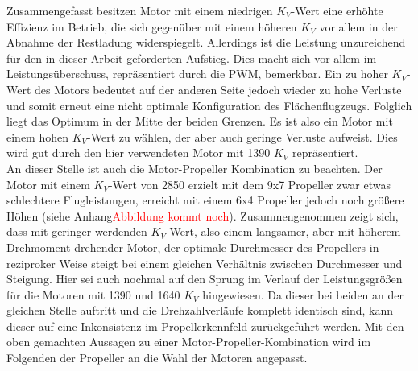 Zusammengefasst besitzen Motor mit einem niedrigen \ensuremath{K_V}-Wert eine erhöhte Effizienz im Betrieb, die sich gegenüber mit einem höheren \ensuremath{K_V} vor allem in der Abnahme der Restladung widerspiegelt. Allerdings ist die Leistung unzureichend für den in dieser Arbeit geforderten Aufstieg. Dies macht sich vor allem im Leistungsüberschuss, repräsentiert durch die PWM, bemerkbar. Ein zu hoher \ensuremath{K_V}-Wert des Motors bedeutet auf der anderen Seite jedoch wieder zu hohe Verluste und somit erneut eine nicht optimale Konfiguration des Flächenflugzeugs. Folglich liegt das Optimum in der Mitte der beiden Grenzen. Es ist also ein Motor mit einem hohen \ensuremath{K_V}-Wert zu wählen, der aber auch geringe Verluste aufweist. Dies wird gut durch den hier verwendeten Motor mit 1390 \ensuremath{K_V} repräsentiert. \\
An dieser Stelle ist auch die Motor-Propeller Kombination zu beachten. Der Motor mit einem \ensuremath{K_V}-Wert von 2850 erzielt mit dem 9x7 Propeller zwar etwas schlechtere Flugleistungen, erreicht mit einem 6x4 Propeller jedoch noch größere Höhen (siehe Anhang\textcolor{red}{Abbildung kommt noch}). Zusammengenommen zeigt sich, dass mit geringer werdenden \ensuremath{K_V}-Wert, also einem langsamer, aber mit höherem Drehmoment drehender Motor, der optimale Durchmesser des Propellers in reziproker Weise steigt bei einem gleichen Verhältnis zwischen Durchmesser und Steigung. %
Hier sei auch nochmal auf den Sprung im Verlauf der Leistungsgrößen für die Motoren mit 1390 und 1640 \ensuremath{K_V} hingewiesen. Da dieser bei beiden an der gleichen Stelle auftritt und die Drehzahlverläufe komplett identisch sind, kann dieser auf eine Inkonsistenz im Propellerkennfeld zurückgeführt werden.
Mit den oben gemachten Aussagen zu einer Motor-Propeller-Kombination wird im Folgenden der Propeller an die Wahl der Motoren angepasst.


